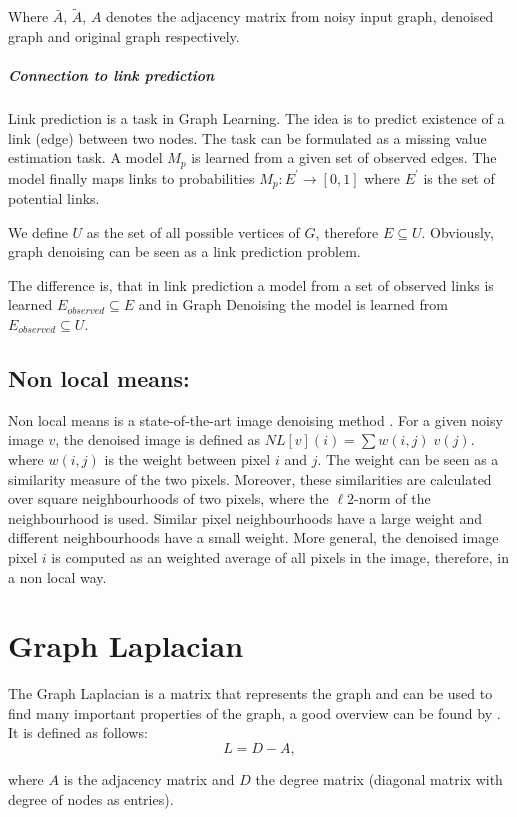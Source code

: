 Where $\bar{A}$, $\tilde{A}$, $A$ denotes the adjacency matrix from noisy input graph, denoised
 graph and original graph respectively.

\subparagraph{Connection to link prediction}
Link prediction is a task in Graph Learning. 
The idea is to predict existence of a link (edge) between two nodes.
The task can be formulated as a missing value estimation task. A model $M_p$ is learned
from a given set of observed edges. The model finally maps links to probabilities
$M_p : E^{\prime} \rightarrow [0,1]$ where $E^{\prime}$ is the set of potential links.

We define $U$ as the set of all possible vertices of $G$, therefore $E \subseteq U$.
Obviously, graph denoising can be seen as a link prediction problem.

The difference is, that in link prediction a model from a set of observed links is learned
$E_{observed} \subseteq E$ and in Graph Denoising the model is learned from 
$E_{observed} \subseteq U$. 

\subsection{Non local means:}
Non local means is a state-of-the-art image denoising method \cite{noneLocalMean}.
For a given noisy image $v$, the denoised image is defined as $NL[v](i) = \sum{w(i,j) \; v(j)}$.
where $w(i,j)$ is the weight between pixel $i$ and $j$. The weight can be seen as a similarity measure of the two pixels.
Moreover, these similarities are calculated over square neighbourhoods of  two pixels,
where the $\ell2$-norm of the neighbourhood is used.
Similar pixel neighbourhoods have a large weight and different neighbourhoods have a small weight.
More general, the denoised image pixel $i$ is computed as an weighted average of all pixels in the 
image, therefore, in a non local way.


\section{Graph Laplacian}
The Graph Laplacian is a matrix that represents the graph and can be used to find many important properties of the graph, 
a good overview can be found by \cite{tutorialSpectralClustering, SpectralGraphTheory}. 
It is defined as follows:
\begin{equation}
    L = D - A,
\end{equation}

where $A$ is the adjacency matrix and $D$ the degree matrix (diagonal matrix with degree of nodes as entries).


